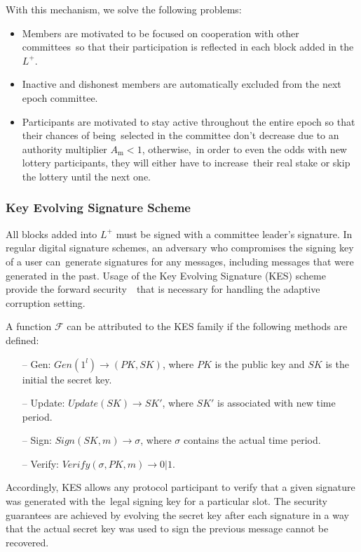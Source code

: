 With this mechanism, we solve the following problems:
\begin{itemize}
    \item Members are motivated to be focused on cooperation with other committees\
    so that their participation is reflected in each block added in the $L^+$.
    \item Inactive and dishonest members are automatically excluded from the next epoch committee.
    \item Participants are motivated to stay active throughout the entire epoch so that their chances of being\
    selected in the committee don't decrease due to an authority multiplier ${A_{\text{m}} < 1}$, otherwise,\
    in order to even the odds with new lottery participants, they will either have to increase\
    their real stake or skip the lottery until the next one.
\end{itemize}

\subsubsection{Key Evolving Signature Scheme}\label{subsubsec:kes}
All blocks added into $L^+$ must be signed with a committee leader's signature.
In regular digital signature schemes, an adversary who compromises the signing key of a user can\
generate signatures for any messages, including messages that were generated in the past.
Usage of the Key Evolving Signature (KES) scheme provide the forward security~\cite{cryptoeprint:2001/034}\
that is necessary for handling the adaptive corruption setting.

A function $\mathcal{F}$ can be attributed to the KES family if the following methods are defined:
\begin{itemize}
    \item[--] Gen: ${Gen(1^l) \rightarrow (PK, SK)}$, where $PK$ is the public key and $SK$ is the initial the secret key.
    \item[--] Update:  ${Update(SK) \rightarrow SK'}$, where $SK'$ is associated with new time period.
    \item[--] Sign: ${Sign(SK, m) \rightarrow \sigma}$, where $\sigma$ contains the actual time period.
    \item[--] Verify:  ${Verify(\sigma, PK, m) \rightarrow 0 | 1}$.
\end{itemize}
Accordingly, KES allows any protocol participant to verify that a given signature was generated with the\
legal signing key for a particular slot.
The security guarantees are achieved by evolving the secret key after each signature
in a way that the actual secret key was used to sign the previous message
cannot be recovered.

